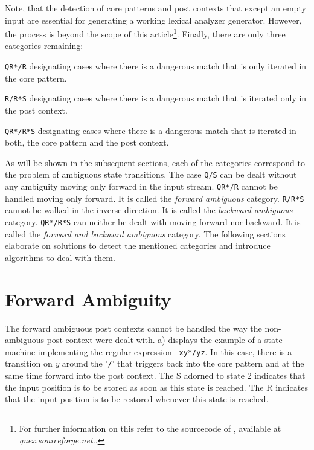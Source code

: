 Note, that the detection of core patterns and post contexts that except an
empty input are essential for generating a working lexical analyzer generator.
However, the process is beyond the scope of this article\footnote{For further
information on this refer to the sourcecode of \quex, available at
{\it quex.sourceforge.net.}.}.  Finally, there are only three categories
remaining:

\begin{mycategory}  {\tt QR*/R} designating cases where there is a
dangerous match that is only iterated in the core pattern.
\end{mycategory}

\begin{mycategory}  {\tt R/R*S} designating cases where there is a dangerous match
that is iterated only in the post context.
\end{mycategory}

\begin{mycategory}  {\tt QR*/R*S} designating cases where there is a dangerous match
that is iterated in both, the core pattern and the post context.
\end{mycategory}

As will be shown in the subsequent sections, each of the categories correspond
to the problem of ambiguous state transitions. The case {\tt Q/S} can be dealt
without any ambiguity moving only forward in the input stream. {\tt QR*/R}
cannot be handled moving only forward. It is called the {\it forward ambiguous}
category.  {\tt R/R*S} cannot be walked in the inverse direction. It is called
the {\it backward ambiguous} category. {\tt QR*/R*S} can neither be dealt with
moving forward nor backward.  It is called the {\it forward and backward
ambiguous} category. The following sections elaborate on solutions to
 detect the mentioned categories and introduce algorithms to deal with them.


\section{Forward Ambiguity}
\label{sec:forward-ambiguous}

The forward ambiguous post contexts cannot be handled the way the
non-ambiguous post context were dealt with.  a) displays
the example of a state machine implementing the regular expression {\tt
    xy*/yz}. In this case, there is a transition on {\it y} around the
    '\verb|/|' that triggers back into the core pattern and at the same time
    forward into the post context.  The {\sf S} adorned to state 2 indicates
    that the input position is to be stored as soon as this state is reached.
    The {\sf R} indicates that the input position is to be restored whenever
    this state is reached.

